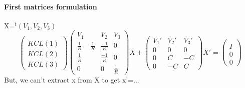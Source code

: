 \documentclass[10pt]{article}
\begin{document}
\paragraph{First matrices formulation}
X=$^{t}(V_{1},V_{2},V_{3})$\\
\[\left(\begin{array}{c}
  \\
  KCL(1)\\  KCL(2)\\  KCL(3)
  \end{array}\right)
\left(\begin{array}{ccc}
  V_{1}&V_{2}&V_{3}\\
  \hline
  \frac{1}{R}-\frac{1}{R}&  \frac{-1}{R}&0\\
  \frac{1}{R}&  \frac{-1}{R}&0\\
  0&0&\frac{1}{R}
\end{array}\right)X+
\underline{
\left(\begin{array}{ccc}
   V_{1}'&V_{2}'&V_{3}'\\
  \hline
0&0&0\\
  0&C&-C\\
  0&-C&C
\end{array}\right)}X'=
\left(\begin{array}{c}
  \\
  I\\
  0\\
  0
  \end{array}\right)
\]
But, we can't extract x from X to get x'=...\\
\newline
\end{document}
